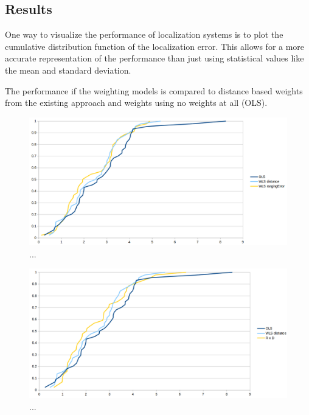 \subsection{Results}
One way to visualize the performance of localization systems is to plot the cumulative distribution function of the localization error. This allows for a more accurate representation of the performance than just using statistical values like the mean and standard deviation.

The performance if the weighting models is compared to distance based weights from the existing approach and weights using no weights at all (OLS).

\begin{figure}[htp]

\label{fig:SVM}
\centering
\includegraphics[width=\textwidth]{Figures/Weighting1.png}
\decoRule
\caption[...]{...}

\end{figure}
\begin{figure}[htp]

\label{fig:SVM}
\centering
\includegraphics[width=\textwidth]{Figures/Weighting2.png}
\decoRule
\caption[...]{...}

\end{figure}
